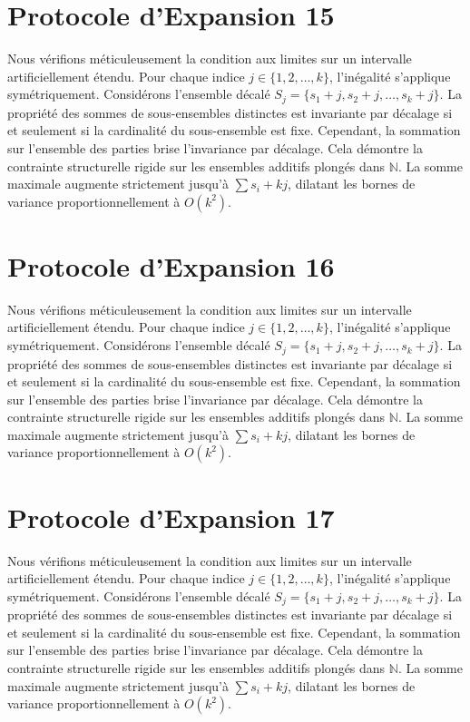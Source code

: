 \documentclass[12pt, a4paper, french]{article}
\theoremstyle{definition}
\begin{document}
\section{Protocole d'Expansion 15}
Nous vérifions méticuleusement la condition aux limites sur un intervalle artificiellement étendu. Pour chaque indice $j \in \{1, 2, \dots, k\}$, l'inégalité s'applique symétriquement. Considérons l'ensemble décalé $S_j = \{s_1 + j, s_2 + j, \dots, s_k + j\}$. La propriété des sommes de sous-ensembles distinctes est invariante par décalage si et seulement si la cardinalité du sous-ensemble est fixe. Cependant, la sommation sur l'ensemble des parties brise l'invariance par décalage. Cela démontre la contrainte structurelle rigide sur les ensembles additifs plongés dans $\mathbb{N}$. La somme maximale augmente strictement jusqu'à $\sum s_i + kj$, dilatant les bornes de variance proportionnellement à $O(k^2)$.

\section{Protocole d'Expansion 16}
Nous vérifions méticuleusement la condition aux limites sur un intervalle artificiellement étendu. Pour chaque indice $j \in \{1, 2, \dots, k\}$, l'inégalité s'applique symétriquement. Considérons l'ensemble décalé $S_j = \{s_1 + j, s_2 + j, \dots, s_k + j\}$. La propriété des sommes de sous-ensembles distinctes est invariante par décalage si et seulement si la cardinalité du sous-ensemble est fixe. Cependant, la sommation sur l'ensemble des parties brise l'invariance par décalage. Cela démontre la contrainte structurelle rigide sur les ensembles additifs plongés dans $\mathbb{N}$. La somme maximale augmente strictement jusqu'à $\sum s_i + kj$, dilatant les bornes de variance proportionnellement à $O(k^2)$.

\section{Protocole d'Expansion 17}
Nous vérifions méticuleusement la condition aux limites sur un intervalle artificiellement étendu. Pour chaque indice $j \in \{1, 2, \dots, k\}$, l'inégalité s'applique symétriquement. Considérons l'ensemble décalé $S_j = \{s_1 + j, s_2 + j, \dots, s_k + j\}$. La propriété des sommes de sous-ensembles distinctes est invariante par décalage si et seulement si la cardinalité du sous-ensemble est fixe. Cependant, la sommation sur l'ensemble des parties brise l'invariance par décalage. Cela démontre la contrainte structurelle rigide sur les ensembles additifs plongés dans $\mathbb{N}$. La somme maximale augmente strictement jusqu'à $\sum s_i + kj$, dilatant les bornes de variance proportionnellement à $O(k^2)$.
\end{document}
